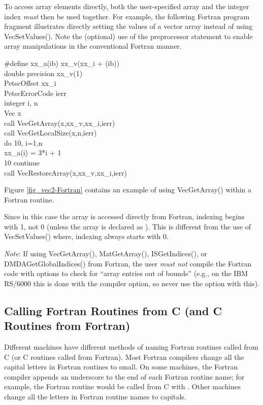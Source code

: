 To access array elements directly, both the user-specified array and
the integer index {\em must} then be used together.  
For example, the following Fortran program fragment illustrates
directly setting the values of a vector array instead of using VecSetValues().  Note the (optional) use of the preprocessor 
 statement to enable array manipulations in the conventional
Fortran manner.
\begin{tabbing}
   \#define xx\_a(ib)  xx\_v(xx\_i + (ib))\\

    double precision xx\_v(1)\\
    PetscOffset      xx\_i\\
    PetscErrorCode ierr\\
    integer          i, n\\
    Vec              x\\
    call VecGetArray(x,xx\_v,xx\_i,ierr)\\
    call VecGetLocalSize(x,n,ierr)\\
    do 10, i=1,n\\
       xx\_a(i) = 3*i + 1\\
 10 continue\\
    call VecRestoreArray(x,xx\_v,xx\_i,ierr)
\end{tabbing}
Figure \ref{fig_vec2-Fortran} contains an example of using VecGetArray()
within a Fortran routine.

Since in this case the array is accessed directly from Fortran,
indexing begins with 1, not 0 (unless the array is declared as ).
This is different from the use of VecSetValues()
where, indexing always starts with 0.

{\em Note}: If using VecGetArray(), MatGetArray(), ISGetIndices(),
or DMDAGetGlobalIndices()
from Fortran, the user {\em must not} compile the Fortran code with options 
to check for ``array entries out of bounds'' (e.g., on the IBM RS/6000 this 
is done with the  compiler option, so never use the  option with this).

\subsection{Calling Fortran Routines from C (and C Routines from Fortran)}


Different machines have
different methods of naming Fortran routines called from C 
(or C routines called from Fortran). Most Fortran compilers change
all the capital letters in Fortran routines to small. On some machines, the 
Fortran compiler appends an underscore to the end of each Fortran 
routine name; for example, the Fortran routine 
would be called from C with .  Other machines
change all the letters in Fortran routine names to capitals. 

